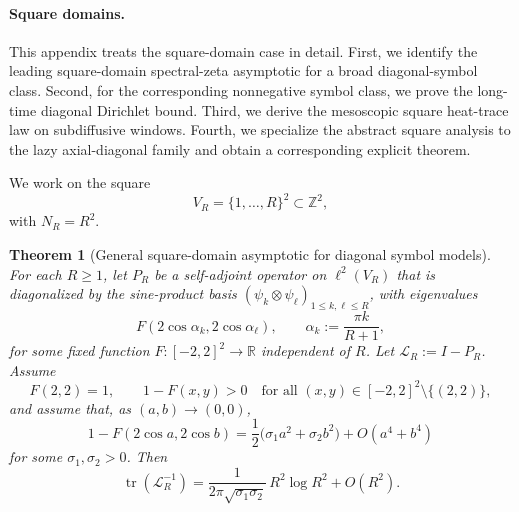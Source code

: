\documentclass[reqno]{amsart}
\numberwithin{equation}{section}
\newtheorem{theorem}{Theorem}[section]
\theoremstyle{definition}
\theoremstyle{remark}
\DeclareMathOperator{\tr}{tr}
\begin{document}
\paragraph{Square domains.}
This appendix treats the square-domain case in detail. First, we identify the leading square-domain spectral-zeta asymptotic for a broad diagonal-symbol class. Second, for the corresponding nonnegative symbol class, we prove the long-time diagonal Dirichlet bound. Third, we derive the mesoscopic square heat-trace law on subdiffusive windows. Fourth, we specialize the abstract square analysis to the lazy axial-diagonal family and obtain a corresponding explicit theorem.

We work on the square
\[
V_R=\{1,\dots,R\}^2 \subset \mathbb{Z}^2,
\]
with $N_R=R^2$.

\begin{theorem}[General square-domain asymptotic for diagonal symbol models]\label{thm:poly_square}
For each $R\ge1$, let $P_R$ be a self-adjoint operator on $\ell^2(V_R)$ that is diagonalized by the sine-product basis $(\psi_k\otimes\psi_\ell)_{1\le k,\ell\le R}$, with eigenvalues
\[
  F(2\cos\alpha_k,2\cos\alpha_\ell),
  \qquad
  \alpha_k:=\frac{\pi k}{R+1},
\]
for some fixed function $F:[-2,2]^2\to\mathbb R$ independent of $R$. Let $\mathcal L_R:=I-P_R$. Assume
\[
  F(2,2)=1,
  \qquad
  1-F(x,y)>0
  \quad\text{for all }(x,y)\in[-2,2]^2\setminus\{(2,2)\},
\]
and assume that, as $(a,b)\to(0,0)$,
\[
  1-F(2\cos a,2\cos b)
  =
  \frac12\bigl(\sigma_1 a^2+\sigma_2 b^2\bigr)+O(a^4+b^4)
\]
for some $\sigma_1,\sigma_2>0$. Then
\[
  \tr(\mathcal L_R^{-1})
  =
  \frac{1}{2\pi\sqrt{\sigma_1\sigma_2}}\,R^2\log R^2
  + O(R^2).
\]
\end{theorem}
\end{document}
